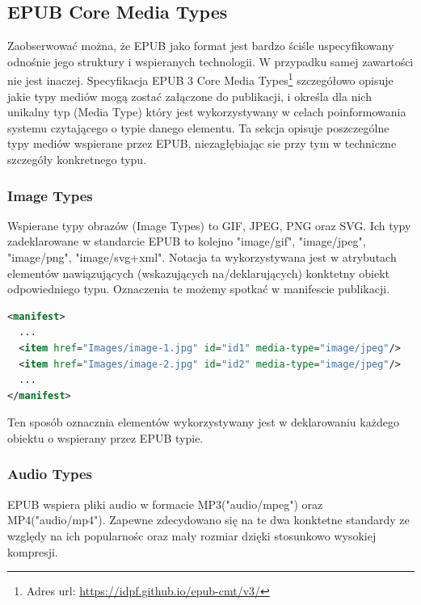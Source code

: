 \subsection{EPUB Core Media Types}

Zaobserwować można, że EPUB jako format jest bardzo ściśle uspecyfikowany odnośnie jego struktury i wspieranych technologii. W przypadku samej zawartości nie jest inaczej. Specyfikacja EPUB 3 Core Media Types\footnote{Adres url: \href{https://idpf.github.io/epub-cmt/v3/}{https://idpf.github.io/epub-cmt/v3/}} szczegółowo opisuje jakie typy mediów mogą zostać załączone do publikacji, i określa dla nich unikalny typ (Media Type) który jest wykorzystywany w celach poinformowania systemu czytającego o typie danego elementu. Ta sekcja opisuje poszczególne typy mediów wspierane przez EPUB, niezagłębiając sie przy tym w techniczne szczegóły konkretnego typu.

\subsubsection*{Image Types}

Wspierane typy obrazów (Image Types) to GIF, JPEG, PNG oraz SVG. Ich typy zadeklarowane w standarcie EPUB to kolejno "image/gif", "image/jpeg", "image/png", "image/svg+xml". Notacja ta wykorzystywana jest w atrybutach elementów nawiązujących (wskazujących na/deklarujących) konktetny obiekt odpowiedniego typu. Oznaczenia te możemy spotkać w manifescie publikacji.

\begin{lstlisting}[caption={Przykładowy fragment manifestu znajdującego się w pliku content.opf}, language=XML]
<manifest>
  ...
  <item href="Images/image-1.jpg" id="id1" media-type="image/jpeg"/>
  <item href="Images/image-2.jpg" id="id2" media-type="image/jpeg"/>
  ...
</manifest>
\end{lstlisting}

Ten sposób oznacznia elementów wykorzystywany jest w deklarowaniu każdego obiektu o wspierany przez EPUB typie.

\subsubsection*{Audio Types}

EPUB wspiera pliki audio w formacie MP3("audio/mpeg") oraz MP4("audio/mp4"). Zapewne zdecydowano się na te dwa konktetne standardy ze względy na ich popularnośc oraz mały rozmiar dzięki stosunkowo wysokiej kompresji.

